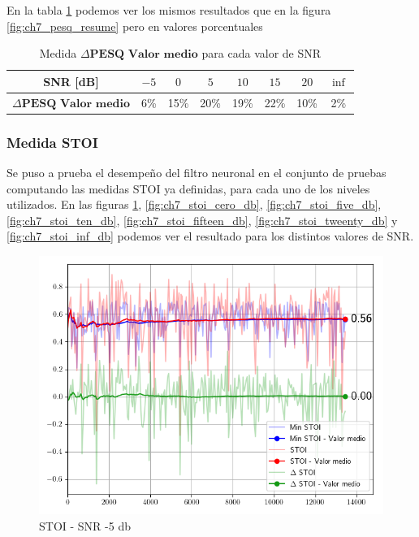 En la tabla \ref{table:neural_filter_pesq_resume} podemos ver los mismos resultados que en la figura \ref{fig:ch7_pesq_resume} pero en valores porcentuales

\begin{table}[ht]
	\centering
	\begin{tabular}{ |c|c|c|c|c|c|c|c| } 
		\hline
		SNR [dB] & $-5$ & $0$ & $5$ & $10$ & $15$ & $20$ & $\inf$ \\ 
		\hline
		$\Delta \textbf{PESQ Valor medio}$ & 6\%  & 15\%  & 20\% & 19\% & 22\% & 10\% & 2\% \\
		\hline
	\end{tabular}
	\caption{Medida $\Delta \textbf{PESQ Valor medio}$ para cada valor de SNR}
	\label{table:neural_filter_pesq_resume}
\end{table}


\subsubsection{Medida STOI}

Se puso a prueba el desempeño del filtro neuronal en el conjunto de pruebas computando las medidas STOI ya definidas, para cada uno de los niveles utilizados. En las figuras \ref{fig:ch7_stoi_minus_five_db}, \ref{fig:ch7_stoi_cero_db}, \ref{fig:ch7_stoi_five_db}, \ref{fig:ch7_stoi_ten_db}, \ref{fig:ch7_stoi_fifteen_db},
\ref{fig:ch7_stoi_tweenty_db} y \ref{fig:ch7_stoi_inf_db} podemos ver el resultado para los distintos valores de SNR.

\begin{figure}
	\centering
	\centerline{\includegraphics[scale=0.70]{images/ch7/objective_metrics/metric_STOI_-5db.png}}
	\caption{STOI - SNR -5 db}
	\label{fig:ch7_stoi_minus_five_db}
\end{figure}

